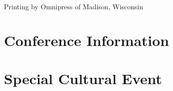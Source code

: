 \documentclass[twoside,makeidx]{book}
\begin{document}
\fancyfoot[C]{}


\fancyfoot[C]{\thepage}



\clearpage
\thispagestyle{empty}
\mbox{}
\vfill
\noindent Printing by Omnipress of Madison, Wisconsin \\

\cleardoublepage
\frontmatter


\setcounter{tocdepth}{2}
\tableofcontents
\mainmatter
\pagestyle{fancy}


\chapter{Conference Information}


\clearpage


\clearpage%
\setheaders{}{}


\clearpage
%
\clearpage%
\setheaders{}{}

%

\clearpage











\chapter[Special Cultural Event]{Special Cultural Event}
\thispagestyle{emptyheader}



\end{document}
